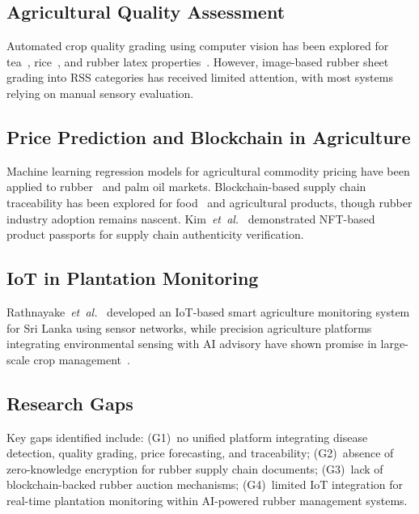 \documentclass[10pt, conference]{IEEEtran}
\begin{document}
\subsection{Agricultural Quality Assessment}

Automated crop quality grading using computer vision has been explored
for tea~\cite{chen2021}, rice~\cite{fabiyi2020}, and rubber latex
properties~\cite{nsbm2023}. However, image-based rubber sheet grading
into RSS categories has received limited attention, with most systems
relying on manual sensory evaluation.

\subsection{Price Prediction and Blockchain in Agriculture}

Machine learning regression models for agricultural commodity pricing
have been applied to rubber~\cite{li2022} and palm oil markets.
Blockchain-based supply chain traceability has been explored for
food~\cite{casino2019} and agricultural products, though rubber
industry adoption remains nascent. Kim~\textit{et~al.}~\cite{kim2020}
demonstrated NFT-based product passports for supply chain authenticity
verification.

\subsection{IoT in Plantation Monitoring}

Rathnayake~\textit{et~al.}~\cite{rathnayake2021} developed an
IoT-based smart agriculture monitoring system for Sri Lanka using
sensor networks, while precision agriculture platforms integrating
environmental sensing with AI advisory have shown promise in
large-scale crop management~\cite{wolfert2017}.

\subsection{Research Gaps}

Key gaps identified include: (G1)~no unified platform integrating
disease detection, quality grading, price forecasting, and
traceability; (G2)~absence of zero-knowledge encryption for rubber
supply chain documents; (G3)~lack of blockchain-backed rubber auction
mechanisms; (G4)~limited IoT integration for real-time plantation
monitoring within AI-powered rubber management systems.

\end{document}
